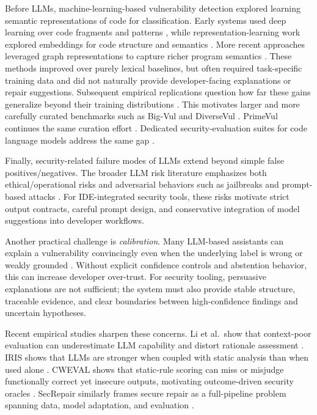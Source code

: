 Before LLMs, machine-learning-based vulnerability detection explored learning semantic representations of code for classification. Early systems used deep learning over code fragments and patterns \cite{li2018vuldeepecker}, while representation-learning work explored embeddings for code structure and semantics \cite{alon2019code2vec}. More recent approaches leveraged graph representations to capture richer program semantics \cite{zhou2019devign,allamanis2018learninggraphs}. These methods improved over purely lexical baselines, but often required task-specific training data and did not naturally provide developer-facing explanations or repair suggestions. Subsequent empirical replications question how far these gains generalize beyond their training distributions \cite{chakraborty2022deep,steenhoek2023empirical}. This motivates larger and more carefully curated benchmarks such as Big-Vul and DiverseVul \cite{fan2020bigvul,chen2023diversevul}. PrimeVul continues the same curation effort \cite{ding2024primevul}. Dedicated security-evaluation suites for code language models address the same gap \cite{bhatt2023cyberseceval,tony2023llmseceval}.

Finally, security-related failure modes of LLMs extend beyond simple false positives/negatives. The broader LLM risk literature emphasizes both ethical/operational risks \cite{weidinger2021ethical} and adversarial behaviors such as jailbreaks and prompt-based attacks \cite{zou2023universal}. For IDE-integrated security tools, these risks motivate strict output contracts, careful prompt design, and conservative integration of model suggestions into developer workflows.

Another practical challenge is \emph{calibration}. Many LLM-based assistants can explain a vulnerability convincingly even when the underlying label is wrong or weakly grounded \cite{kadavath2022know,spiess2024calibration}. Without explicit confidence controls and abstention behavior, this can increase developer over-trust. For security tooling, persuasive explanations are not sufficient; the system must also provide stable structure, traceable evidence, and clear boundaries between high-confidence findings and uncertain hypotheses.

Recent empirical studies sharpen these concerns. Li et al.\ show that context-poor evaluation can underestimate LLM capability and distort rationale assessment \cite{li2025correct}. IRIS shows that LLMs are stronger when coupled with static analysis than when used alone \cite{li2025iris}. CWEVAL shows that static-rule scoring can miss or misjudge functionally correct yet insecure outputs, motivating outcome-driven security oracles \cite{peng2025cweval}. SecRepair similarly frames secure repair as a full-pipeline problem spanning data, model adaptation, and evaluation \cite{islam2024secrepair}.

